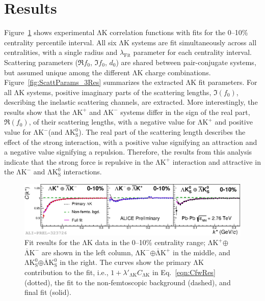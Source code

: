 \documentclass{svproc}
\newcommand{\LamK}{$\mathrm{\Lambda}\mathrm{K}$\xspace}
\newcommand{\LamKchP}{$\mathrm{\Lambda}\mathrm{K^{+}}$\xspace}
\newcommand{\ALamKchM}{$\overline{\mathrm{\Lambda}}\mathrm{K^{-}}$\xspace}
\newcommand{\LamKchM}{$\mathrm{\Lambda}\mathrm{K^{-}}$\xspace}
\newcommand{\ALamKchP}{$\overline{\mathrm{\Lambda}}\mathrm{K^{+}}$\xspace}
\newcommand{\LamKs}{$\mathrm{\Lambda}\mathrm{K^{0}_{S}}$\xspace}
\newcommand{\ALamKs}{$\overline{\mathrm{\Lambda}}\mathrm{K^{0}_{S}}$\xspace}
\begin{document}
\section{Results}
\label{sec:Results}

Figure~\ref{fig:LamKFits_3Res} shows experimental \LamK correlation functions with fits for the 0--10\% centrality percentile interval.
All six \LamK systems are fit simultaneously across all centralities, with a single radius and $\lambda_{\mathrm{Fit}}$ parameter for each centrality interval.
Scattering parameters ($\Re f_{0}$, $\Im f_{0}$, $d_{0}$) are shared between pair-conjugate systems, but assumed unique among the different \LamK charge combinations. 
Figure~\ref{fig:ScattParams_3Res} summarizes the extracted \LamK fit parameters.
For all \LamK systems, positive imaginary parts of the scattering lengths, $\Im(f_{0})$, describing the inelastic scattering channels, are extracted. 
More interestingly, the results show that the \LamKchP and \LamKchM systems differ in the sign of the real part, $\Re(f_{0})$, of their scattering lengths, with a negative value for \LamKchP and positive value for \LamKchM (and \LamKs).
The real part of the scattering length describes the effect of the strong interaction, with a positive value signifying an attraction and a negative value signifying a repulsion.
Therefore, the results from this analysis indicate that the strong force is repulsive in the \LamKchP interaction and attractive in the \LamKchM and \LamKs interactions.
\begin{figure}[h!]
  \centering
  \includegraphics[width=\linewidth]{./2019-06-11-canKStarCfwFits_CombineConj_0010_LabelLines.eps}
  \caption[\LamK data with fits]
  {
  Fit results for the \LamK data in the 0--10\% centrality range; \LamKchP$\oplus$\ALamKchM are shown in the left column, \LamKchM$\oplus$\ALamKchP in the middle, and \LamKs$\oplus$\ALamKs in the right. 
  The curves show the primary \LamK contribution to the fit, i.e., $1 + \lambda'_{\mathrm{\Lambda}\mathrm{K}}C_{\mathrm{\Lambda}\mathrm{K}}$ in Eq.~\ref{eqn:CfwRes} (dotted), the fit to the non-femtoscopic background (dashed), and final fit (solid).
 }
  \label{fig:LamKFits_3Res}
\end{figure}
\end{document}
